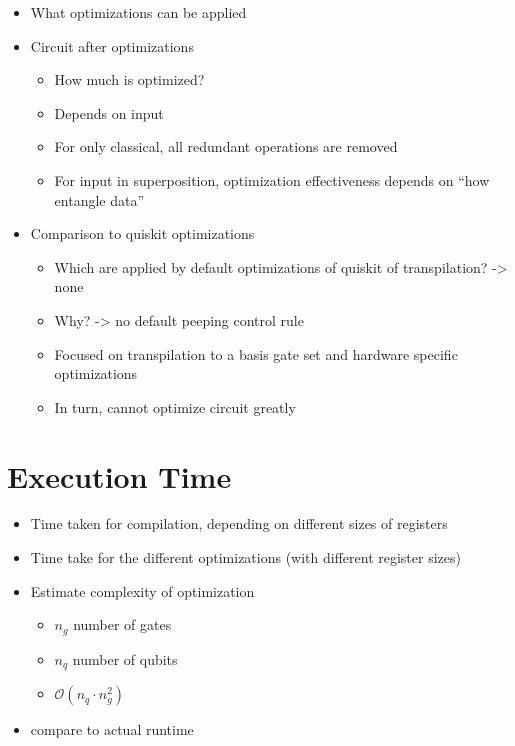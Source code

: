 \begin{itemize}
    \item What optimizations can be applied
    \item Circuit after optimizations
    \begin{itemize}
        \item How much is optimized?
        \item Depends on input
        \item For only classical, all redundant operations are removed
        \item For input in superposition, optimization effectiveness depends on ``how entangle data''
    \end{itemize}
    \item Comparison to quiskit optimizations
    \begin{itemize}
        \item Which are applied by default optimizations of quiskit of transpilation? -> none
        \item Why? -> no default peeping control rule
        \item Focused on transpilation to a basis gate set and hardware specific optimizations 
        \item In turn, cannot optimize circuit greatly
    \end{itemize}
\end{itemize}

\section{Execution Time}
\label{sec:eval_executionTime}
\begin{itemize}
    \item Time taken for compilation, depending on different sizes of registers
    \item Time take for the different optimizations (with different register sizes)
    \item Estimate complexity of optimization
    \begin{itemize}
        \item $n_g$ number of gates
        \item $n_q$ number of qubits
        \item $\mathcal{O}(n_q \cdot n_g^2)$
    \end{itemize}
    \item compare to actual runtime
\end{itemize}

